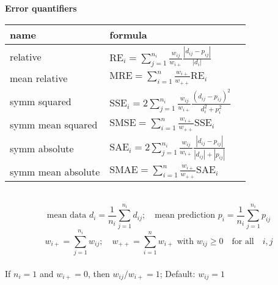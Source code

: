 \documentclass[12pt]{article}\usepackage{a4wide}
\begin{document}
\noindent
\begin{center}
{\large\bf Error quantifiers}\\
\begin{tabular}{lll}\hline
name & formula\\ 
\hline
relative & 
$\mbox{RE}_i = \sum_{j=1}^{n_i} \frac{w_{ij}}{w_{i+}} \frac{|d_{ij} - p_{ij}|}{|d_i|}$
\\[1mm]	
mean relative & 
$\mbox{MRE} =  \sum_{i=1}^n \frac{w_{i+}}{w_{++}} \mbox{RE}_i$
\\[1mm]	
symm squared &
$\mbox{SSE}_i = 2 \sum_{j=1}^{n_i} \frac{w_{ij}} {w_{i+}} \frac{(d_{ij} - p_{ij})^2} {d_i^2 + p_i^2}$
\\[1mm]	
symm mean squared & 
$\mbox{SMSE} = \sum_{i=1}^n \frac{w_{i+}}{w_{++}} \mbox{SSE}_i$
\\[1mm]
symm absolute & 
$\mbox{SAE}_i = 2 \sum_{j=1}^{n_i} \frac{w_{ij}} {w_{i+}} \frac{|d_{ij} - p_{ij}|} {|d_{ij}| + |p_{ij}|}$
\\[1mm]
symm mean absolute & 
$\mbox{SMAE} = \sum_{i=1}^n \frac{w_{i+}}{w_{++}} \mbox{SAE}_i$\\
\hline
\end{tabular}
\\[-3mm]
\[
  \mbox{mean data } d_i = \frac{1}{n_i} \sum_{j=1}^{n_i} d_{ij}; \quad
  \mbox{mean prediction } p_i = \frac{1}{n_i} \sum_{j=1}^{n_i} p_{ij}
\]
\vspace*{-7mm}
\[
  w_{i+} = \sum_{j=1}^{n_i} w_{ij};  \quad
	w_{++} = \sum_{i=1}^n w_{i+} \mbox{ with } w_{ij} \ge 0 \quad \mbox{for all} \quad i,j
\]
\\[-2mm]
If $n_i=1$ and $w_{i+}=0$, then $w_{ij}/w_{i+}=1$; Default: $w_{ij} = 1$
	
\end{center}
\end{document}
